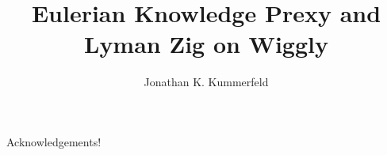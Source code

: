 \documentclass{ucbthesis}
\begin{document}

\title{Eulerian Knowledge Prexy and Lyman Zig on Wiggly}
\author{Jonathan K. Kummerfeld}

\maketitle
\approvalpage
\copyrightpage



\begin{frontmatter}


\tableofcontents
\clearpage
\listoffigures
\clearpage
\listoftables

\begin{acknowledgements}
Acknowledgements!
\end{acknowledgements}

\end{frontmatter}

\pagestyle{headings}









\printbibliography
\end{document}
